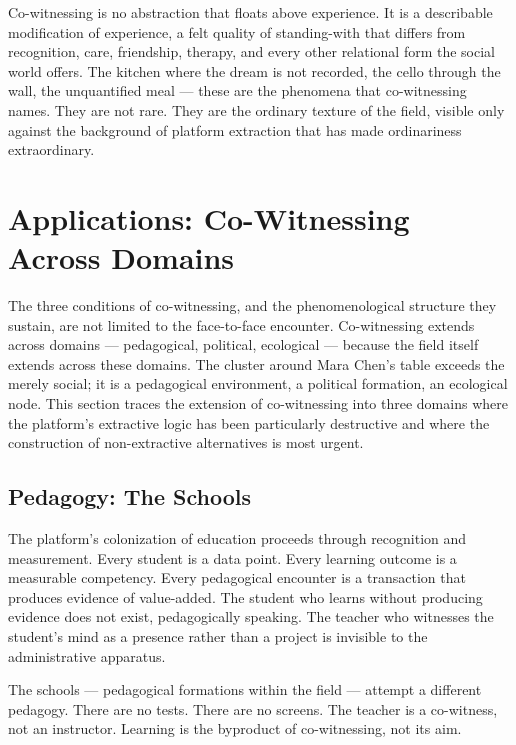 Co-witnessing is no abstraction that floats above experience. It is a describable modification of experience, a felt quality of standing-with that differs from recognition, care, friendship, therapy, and every other relational form the social world offers. The kitchen where the dream is not recorded, the cello through the wall, the unquantified meal — these are the phenomena that co-witnessing names. They are not rare. They are the ordinary texture of the field, visible only against the background of platform extraction that has made ordinariness extraordinary.

\section{Applications: Co-Witnessing Across Domains}

The three conditions of co-witnessing, and the phenomenological structure they sustain, are not limited to the face-to-face encounter. Co-witnessing extends across domains — pedagogical, political, ecological — because the field itself extends across these domains. The cluster around Mara Chen's table exceeds the merely social; it is a pedagogical environment, a political formation, an ecological node. This section traces the extension of co-witnessing into three domains where the platform's extractive logic has been particularly destructive and where the construction of non-extractive alternatives is most urgent.

\subsection{Pedagogy: The  Schools}

The platform's colonization of education proceeds through recognition and measurement. Every student is a data point. Every learning outcome is a measurable competency. Every pedagogical encounter is a transaction that produces evidence of value-added. The student who learns without producing evidence does not exist, pedagogically speaking. The teacher who witnesses the student's mind as a presence rather than a project is invisible to the administrative apparatus.

The  schools — pedagogical formations within the field — attempt a different pedagogy. There are no tests. There are no screens. The teacher is a co-witness, not an instructor. Learning is the byproduct of co-witnessing, not its aim.

